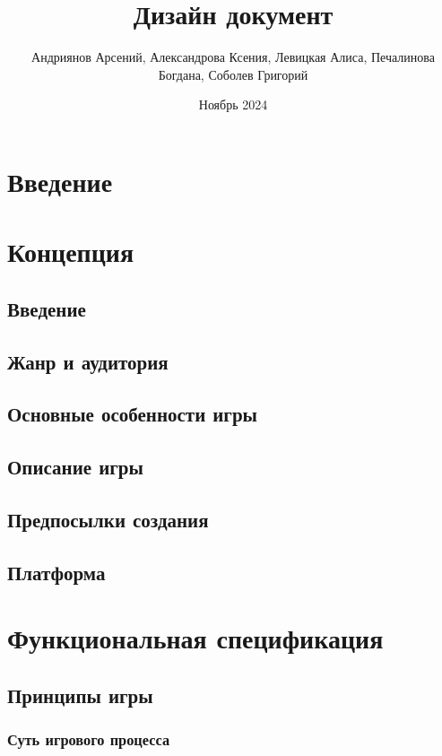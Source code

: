 \documentclass{article}
\title{Дизайн документ}
\author{Андриянов Арсений, Александрова Ксения, Левицкая Алиса, Печалинова Богдана, Соболев Григорий}
\date{Ноябрь 2024}
\begin{document}
	
	\maketitle
	
	\tableofcontents
	
	\section{Введение}
	
	\section{Концепция}
	
	\subsection{Введение}
	
	\subsection{Жанр и аудитория}
	
	\subsection{Основные особенности игры}
	
	\subsection{Описание игры}
	
	\subsection{Предпосылки создания}
	
	\subsection{Платформа}
	
	\section{Функциональная спецификация}
	
	\subsection{Принципы игры}
	
	\subsubsection{Суть игрового процесса}
	
\end{document}
